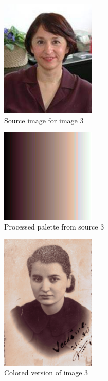 \documentclass[conference]{IEEEtran}
\begin{document}
\begin{figure}[H]
    \centering
    \includegraphics[width=0.4\textwidth]{resources/3_source.png}
    \caption{Source image for image 3}
    \label{fig:image_4_colored}
\end{figure}

\begin{figure}[H]
    \centering
    \includegraphics[width=0.4\textwidth]{resources/3_filled_palette.png}
    \caption{Processed palette from source 3}
    \label{fig:image_4_colored}
\end{figure}

\begin{figure}[H]
    \centering
    \includegraphics[width=0.4\textwidth]{resources/3_colored.jpg}
    \caption{Colored version of image 3}
    \label{fig:image_4_colored}
\end{figure}
\end{document}
